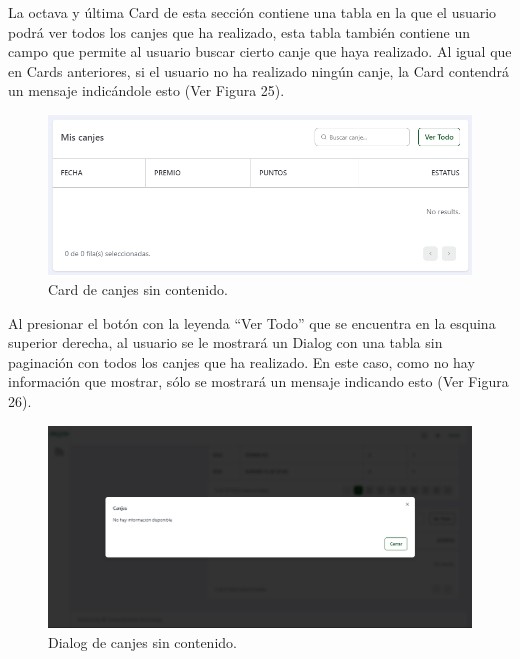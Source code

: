 La octava y última Card de esta sección contiene una tabla en la que el usuario podrá ver todos los canjes que ha realizado, esta tabla también contiene un campo que permite al usuario buscar cierto canje que haya realizado. Al igual que en Cards anteriores, si el usuario no ha realizado ningún canje, la Card contendrá un mensaje indicándole esto (Ver Figura 25).

    \begin{figure}[H]
        \begin{center}
            \includegraphics[scale=0.50]{img/actividades/detalles-campanias/card-canjes.png}
            \caption{Card de canjes sin contenido.}
            \label{fig:card-canjes}
        \end{center}
    \end{figure}

Al presionar el botón con la leyenda ``Ver Todo'' que se encuentra en la esquina superior derecha, al usuario se le mostrará un Dialog con una tabla sin paginación con todos los canjes que ha realizado. En este caso, como no hay información que mostrar, sólo se mostrará un mensaje indicando esto (Ver Figura 26).

    \begin{figure}[H]
        \begin{center}
            \includegraphics[scale=0.35]{img/actividades/detalles-campanias/dialog-canjes-vacio.png}
            \caption{Dialog de canjes sin contenido.}
            \label{fig:dialog-canjes-vacio}
        \end{center}
    \end{figure}

